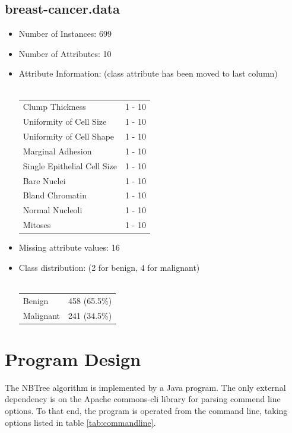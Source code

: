 \documentclass[10pt]{report}
\begin{document}
\subsection*{breast-cancer.data}
\begin{itemize}
\item Number of Instances: 699
\item Number of Attributes: 10
\item Attribute Information: (class attribute has been moved to last column)
  \\\\
  \begin{left}
    \begin{tabular}{ l l }
      Clump Thickness               &  1 - 10  \\
      Uniformity of Cell Size       &  1 - 10  \\
      Uniformity of Cell Shape      &  1 - 10  \\
      Marginal Adhesion             &  1 - 10  \\
      Single Epithelial Cell Size   &  1 - 10  \\
      Bare Nuclei                   &  1 - 10  \\
      Bland Chromatin               &  1 - 10  \\
      Normal Nucleoli               &  1 - 10  \\
      Mitoses                       &  1 - 10  \\
    \end{tabular}
  \end{left}

\item Missing attribute values: 16
\item Class distribution: (2 for benign, 4 for malignant)
  \\\\
  \begin{left}
    \begin{tabular}{ l l }
      Benign       &  458 (65.5\%) \\
      Malignant    &  241 (34.5\%) \\
    \end{tabular}
  \end{left}
\end{itemize}


\section{Program Design}
The NBTree \cite{RefWorks:63} algorithm is implemented by a Java
program. The only external dependency is on the Apache commons-cli
library for parsing commend line options. To that end, the program is
operated from the command line, taking options listed in table
\ref{tab:commandline}.  
\end{document}
